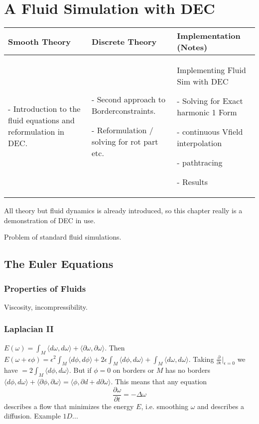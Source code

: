 \chapter{A Fluid Simulation with DEC}
\begin{longtable}{|p{4.5cm}|p{4.5cm}|p{4.5cm}|}
	\hline
	Smooth Theory& Discrete Theory& Implementation (Notes)\\
	\hline
		\begin{packed_enum}
			\item[-] Introduction to the fluid equations and reformulation in DEC.
		\end{packed_enum}
		&
		\begin{packed_enum}
			\item[-] Second approach to Borderconstraints.
			\item[-] Reformulation / solving for rot part etc.
		\end{packed_enum}
		 & 
		 Implementing Fluid Sim with DEC
		 \begin{packed_enum}
			\item[-] Solving for Exact harmonic 1 Form
			\item[-] continuous Vfield interpolation
			\item[-] pathtracing
			\item[-] Results
		\end{packed_enum}
		 \\		
	\hline
\end{longtable}
All theory but fluid dynamics is already introduced, so this chapter really is a demonstration of DEC in use. 

Problem of standard fluid simulations.

\section{The Euler Equations}
\subsection{Properties of Fluids}
Viscosity, incompressibility.

\subsection{Laplacian II}
$E(\omega) = \int_M \langle d\omega, d\omega \rangle + \langle \partial\omega, \partial\omega \rangle$. Then $E(\omega + \epsilon\phi) = \epsilon^2\int_M \langle d\phi, d\phi \rangle + 2\epsilon\int_M \langle d\phi, d\omega \rangle + \int_M \langle d\omega, d\omega \rangle$. Taking $\frac{\partial}{\partial \epsilon} |_{\epsilon = 0}$ we have $=2\int_M \langle d\phi, d\omega \rangle$. But if $\phi = 0$ on borders or $M$ has no borders $\langle d\phi, d\omega \rangle + \langle \partial\phi, \partial\omega \rangle= \langle \phi, \partial d + d \partial\omega \rangle$. This means that any equation 
\[\frac{\partial \omega}{ \partial t} = - \Delta \omega \]
describes a flow that minimizes the energy $E$, i.e. smoothing $\omega$ and describes a diffusion. Example $1D$...
	
